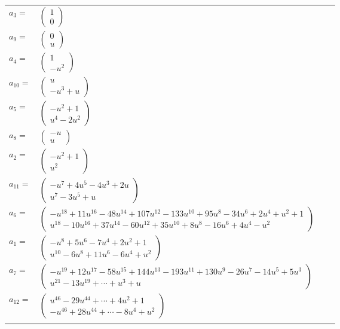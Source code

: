 \documentclass[1p]{elsarticle_modified}
\theoremstyle{definition}
\begin{document}
\begin{tabular}{m{7pt} m{180pt} m{7pt} m{180pt} }
\flushright $a_{3}=$&$\begin{pmatrix}1\\0\end{pmatrix}$ \\
\flushright $a_{9}=$&$\begin{pmatrix}0\\u\end{pmatrix}$ \\
\flushright $a_{4}=$&$\begin{pmatrix}1\\- u^2\end{pmatrix}$ \\
\flushright $a_{10}=$&$\begin{pmatrix}u\\- u^3+u\end{pmatrix}$ \\
\flushright $a_{5}=$&$\begin{pmatrix}- u^2+1\\u^4-2 u^2\end{pmatrix}$ \\
\flushright $a_{8}=$&$\begin{pmatrix}- u\\u\end{pmatrix}$ \\
\flushright $a_{2}=$&$\begin{pmatrix}- u^2+1\\u^2\end{pmatrix}$ \\
\flushright $a_{11}=$&$\begin{pmatrix}- u^7+4 u^5-4 u^3+2 u\\u^7-3 u^5+u\end{pmatrix}$ \\
\flushright $a_{6}=$&$\begin{pmatrix}- u^{18}+11 u^{16}-48 u^{14}+107 u^{12}-133 u^{10}+95 u^8-34 u^6+2 u^4+u^2+1\\u^{18}-10 u^{16}+37 u^{14}-60 u^{12}+35 u^{10}+8 u^8-16 u^6+4 u^4- u^2\end{pmatrix}$ \\
\flushright $a_{1}=$&$\begin{pmatrix}- u^8+5 u^6-7 u^4+2 u^2+1\\u^{10}-6 u^8+11 u^6-6 u^4+u^2\end{pmatrix}$ \\
\flushright $a_{7}=$&$\begin{pmatrix}- u^{19}+12 u^{17}-58 u^{15}+144 u^{13}-193 u^{11}+130 u^9-26 u^7-14 u^5+5 u^3\\u^{21}-13 u^{19}+\cdots+u^3+u\end{pmatrix}$ \\
\flushright $a_{12}=$&$\begin{pmatrix}u^{46}-29 u^{44}+\cdots+4 u^2+1\\- u^{46}+28 u^{44}+\cdots-8 u^4+u^2\end{pmatrix}$\\&\end{tabular}
\end{document}
